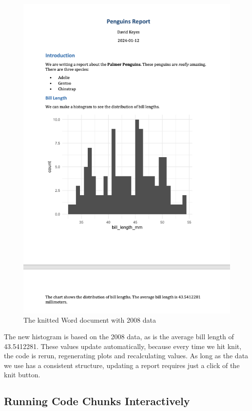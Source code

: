 \documentclass[
]{book}
\begin{document}
\begin{figure}
\includegraphics[width=1\linewidth]{assets/penguins-report-2008} \caption{The knitted Word document with 2008 data}\label{fig:penguins-report-2008}
\end{figure}

The new histogram is based on the 2008 data, as is the average bill length of 43.5412281. These values update automatically, because every time we hit knit, the code is rerun, regenerating plots and recalculating values. As long as the data we use has a consistent structure, updating a report requires just a click of the knit button.

\hypertarget{running-code-chunks-interactively}{%
\subsection*{Running Code Chunks Interactively}\label{running-code-chunks-interactively}}
\end{document}
